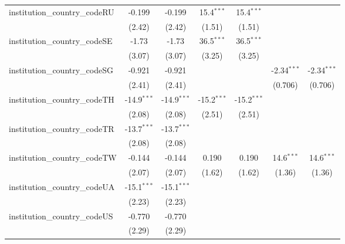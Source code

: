 \begin{tabular}{lcccccc}
   institution\_country\_codeRU          & -0.199        & -0.199        & 15.4$^{***}$  & 15.4$^{***}$  &               &   \\   
                                         & (2.42)        & (2.42)        & (1.51)        & (1.51)        &               &   \\   
   institution\_country\_codeSE          & -1.73         & -1.73         & 36.5$^{***}$  & 36.5$^{***}$  &               &   \\   
                                         & (3.07)        & (3.07)        & (3.25)        & (3.25)        &               &   \\   
   institution\_country\_codeSG          & -0.921        & -0.921        &               &               & -2.34$^{***}$ & -2.34$^{***}$\\   
                                         & (2.41)        & (2.41)        &               &               & (0.706)       & (0.706)\\   
   institution\_country\_codeTH          & -14.9$^{***}$ & -14.9$^{***}$ & -15.2$^{***}$ & -15.2$^{***}$ &               &   \\   
                                         & (2.08)        & (2.08)        & (2.51)        & (2.51)        &               &   \\   
   institution\_country\_codeTR          & -13.7$^{***}$ & -13.7$^{***}$ &               &               &               &   \\   
                                         & (2.08)        & (2.08)        &               &               &               &   \\   
   institution\_country\_codeTW          & -0.144        & -0.144        & 0.190         & 0.190         & 14.6$^{***}$  & 14.6$^{***}$\\   
                                         & (2.07)        & (2.07)        & (1.62)        & (1.62)        & (1.36)        & (1.36)\\   
   institution\_country\_codeUA          & -15.1$^{***}$ & -15.1$^{***}$ &               &               &               &   \\   
                                         & (2.23)        & (2.23)        &               &               &               &   \\   
   institution\_country\_codeUS          & -0.770        & -0.770        &               &               &               &   \\   
                                         & (2.29)        & (2.29)        &               &               &               &   \\   

\end{tabular}

